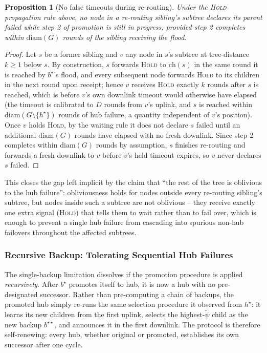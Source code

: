 \documentclass{article}
\newtheorem{proposition}{Proposition}
\begin{document}
\begin{proposition}[No false timeouts during re-routing]
\label{prop:noholdfalsepositive}
    Under the \textsc{Hold} propagation rule above, no node in a re-routing sibling's
    subtree declares its parent failed while step 2 of promotion is still in progress,
    provided step 2 completes within $\mathrm{diam}(G)$ rounds of the sibling receiving
    the flood.
\end{proposition}

\begin{proof}
    Let $s$ be a former sibling and $v$ any node in $s$'s subtree at tree-distance
    $k \geq 1$ below $s$. By construction, $s$ forwards \textsc{Hold} to $\mathrm{ch}(s)$
    in the same round it is reached by $b^\star$'s flood, and every subsequent node
    forwards \textsc{Hold} to its children in the next round upon receipt; hence $v$
    receives \textsc{Hold} exactly $k$ rounds after $s$ is reached, which is before
    $v$'s own downlink timeout would otherwise have elapsed (the timeout is calibrated
    to $D$ rounds from $v$'s uplink, and $s$ is reached within
    $\mathrm{diam}(G\setminus\{h^\star\})$ rounds of hub failure, a quantity independent
    of $v$'s position). Once $v$ holds \textsc{Hold}, by the waiting rule it does not
    declare $s$ failed until an additional $\mathrm{diam}(G)$ rounds have elapsed with no
    fresh downlink. Since step 2 completes within $\mathrm{diam}(G)$ rounds by
    assumption, $s$ finishes re-routing and forwards a fresh downlink to $v$ before $v$'s
    held timeout expires, so $v$ never declares $s$ failed.
\end{proof}

This closes the gap left implicit by the claim that ``the rest of the tree is oblivious
to the hub failure'': obliviousness holds for nodes outside every re-routing sibling's
subtree, but nodes inside such a subtree are not oblivious -- they receive exactly one
extra signal (\textsc{Hold}) that tells them to wait rather than to fail over, which is
enough to prevent a single hub failure from cascading into spurious non-hub failovers
throughout the affected subtrees.

\subsubsection{Recursive Backup: Tolerating Sequential Hub Failures}
\label{sec:ft-recursive}

The single-backup limitation dissolves if the promotion procedure is applied
\emph{recursively}. After $b^\star$ promotes itself to hub, it is now a hub with no
pre-designated successor. Rather than pre-computing a chain of backups, the promoted hub
simply re-runs the same selection procedure it observed from $h^\star$: it learns its new
children from the first uplink, selects the highest-$\tilde\psi$ child as the new backup
$b^{\star\star}$, and announces it in the first downlink. The protocol is therefore
self-renewing: every hub, whether original or promoted, establishes its own successor
after one cycle.
\end{document}
